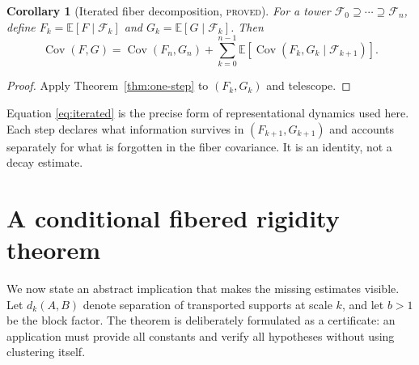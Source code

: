 \documentclass[11pt]{article}
\newcommand{\proved}{\textcolor{provedgreen}{\textsc{proved}}}
\newcommand{\Cov}{\operatorname{Cov}}
\newcommand{\E}{\mathbb E}
\newtheorem{corollary}[definition]{Corollary}
\theoremstyle{remark}
\begin{document}
\begin{corollary}[Iterated fiber decomposition, \proved]\label{cor:iterated}
For a tower $\mathcal F_0\supseteq\cdots\supseteq\mathcal F_n$, define
$F_k=\E[F\mid\mathcal F_k]$ and $G_k=\E[G\mid\mathcal F_k]$.  Then
\begin{equation}\label{eq:iterated}
 \Cov(F,G)=\Cov(F_n,G_n)
 +\sum_{k=0}^{n-1}
 \E\!\left[\Cov(F_k,G_k\mid\mathcal F_{k+1})\right].
\end{equation}
\end{corollary}
\begin{proof}
Apply Theorem~\ref{thm:one-step} to $(F_k,G_k)$ and telescope.
\end{proof}

Equation \eqref{eq:iterated} is the precise form of representational dynamics
used here.  Each step declares what information survives in $(F_{k+1},G_{k+1})$
and accounts separately for what is forgotten in the fiber covariance.  It is
an identity, not a decay estimate.

\section{A conditional fibered rigidity theorem}

We now state an abstract implication that makes the missing estimates visible.
Let $d_k(A,B)$ denote separation of transported supports at scale $k$, and let
$b>1$ be the block factor.  The theorem is deliberately formulated as a
certificate: an application must provide all constants and verify all
hypotheses without using clustering itself.
\end{document}
